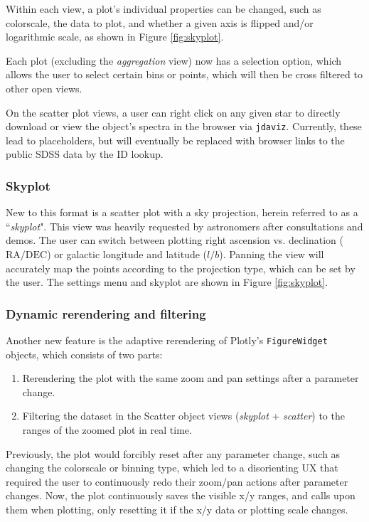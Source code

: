 \documentclass[a4paper,10pt,twocolumn]{article}
\begin{document}
Within each view, a plot's individual properties can be changed, such as colorscale, the data to plot, and whether a given axis is flipped and/or logarithmic scale, as shown in Figure \ref{fig:skyplot}.

Each plot (excluding the \emph{aggregation} view) now has a selection option, which allows the user to select certain bins or points, which will then be cross filtered to other open views.

On the scatter plot views, a user can right click on any given star to directly download or view the object's spectra in the browser via \texttt{jdaviz}. Currently, these lead to placeholders, but will eventually be replaced with browser links to the public SDSS data by the ID lookup.

\subsubsection{Skyplot}
\label{sec:skyplot}
New to this format is a scatter plot with a sky projection, herein referred to as a ``\emph{skyplot}". This view was heavily requested by astronomers after consultations and demos. The user can switch between plotting right ascension vs. declination ($\mathrm{RA / DEC} $) or galactic longitude and latitude ($l / b $). Panning the view will accurately map the points according to the projection type, which can be set by the user. The settings menu and skyplot are shown in Figure \ref{fig:skyplot}.


\subsubsection{Dynamic rerendering and filtering}
\label{sec:rerender}
Another new feature is the adaptive rerendering of Plotly's \texttt{FigureWidget} objects, which consists of two parts:
\begin{enumerate}
	\item Rerendering the plot with the same zoom and pan settings after a parameter change.
	\item Filtering the dataset in the Scatter object views (\emph{skyplot} + \emph{scatter}) to the ranges of the zoomed plot in real time.
\end{enumerate}

Previously, the plot would forcibly reset after any parameter change, such as changing the colorscale or binning type, which led to a disorienting UX that required the user to continuously redo their zoom/pan actions after parameter changes. Now, the plot continuously saves the visible x/y ranges, and calls upon them when plotting, only resetting it if the x/y data or plotting scale changes.
\end{document}
